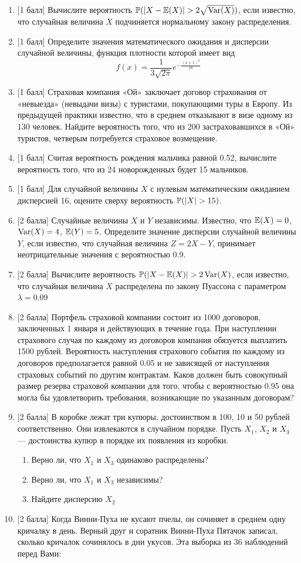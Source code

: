 \documentclass[12pt, a4paper]{article}\usepackage[]{graphicx}\usepackage[]{color}
\begin{document}
\begin{enumerate}
\item $[$1 балл] Вычислите вероятность $\P(|X-\E(X)|>2\sqrt{\Var(X)})$, если известно, что
случайная величина $X$ подчиняется нормальному закону распределения.
\item $[$1 балл] Определите значения математического ожидания и дисперсии случайной
величины, функция плотности которой имеет вид
\[
f(x)=\frac{1}{3\sqrt{2\pi}}e^{-\frac{(x+1)^2}{18}}
\]
\item $[$1 балл] Страховая компания «Ой» заключает договор страхования от «невыезда» (невыдачи визы) с туристами, покупающими туры в Европу. Из предыдущей практики известно,
что в среднем отказывают в визе одному из 130 человек. Найдите вероятность того, что из 200
застраховавшихся в «Ой» туристов, четверым потребуется страховое возмещение.
\item $[$1 балл] Считая вероятность рождения мальчика равной 0.52, вычислите вероятность того, что
из 24 новорожденных будет 15 мальчиков.
\item $[$1 балл] Для случайной величины $X$ с нулевым математическим ожиданием
дисперсией 16, оцените сверху вероятность $\P(|X| > 15)$.
\item $[$2 балла] Случайные величины $X$ и $Y$ независимы. Известно, что $\E(X)=0$, $\Var(X)=4$, $\E(Y)=5$. Определите значение дисперсии случайной величины $Y$, если известно, что случайная величина $Z=2X-Y$, принимает неотрицательные значения с вероятностью 0.9.
\item $[$2 балла] Вычислите вероятность $\P(| X - \E(X)| > 2\Var(X)$, если известно, что
случайная величина $X$ распределена по закону Пуассона с параметром $\lambda = 0.09$
\item $[$2 балла] Портфель страховой компании состоит из 1000 договоров, заключенных 1
января и действующих в течение года. При наступлении страхового случая по каждому из
договоров компания обязуется выплатить 1500 рублей. Вероятность наступления страхового
события по каждому из договоров предполагается равной 0.05 и не зависящей от наступления
страховых событий по другим контрактам. Каков должен быть совокупный размер резерва
страховой компании для того, чтобы с вероятностью 0.95 она могла бы удовлетворить
требования, возникающие по указанным договорам?
\item $[$2 балла] В коробке лежат три купюры, достоинством в 100, 10 и 50 рублей
соответственно. Они извлекаются в случайном порядке. Пусть $X_1$, $X_2$ и $X_3$ — достоинства
купюр в порядке их появления из коробки.
\begin{enumerate}
\item Верно ли, что $X_1$ и $X_3$ одинаково распределены?
\item Верно ли, что $X_1$ и $X_3$ независимы?
\item Найдите дисперсию $X_2$
\end{enumerate}
\item $[$2 балла] Когда Винни-Пуха не кусают пчелы, он сочиняет в среднем одну кричалку в день.
Верный друг и соратник Винни-Пуха Пятачок записал, сколько кричалок сочинялось в дни
укусов. Эта выборка из 36 наблюдений перед Вами:


\end{enumerate}
\end{document}
